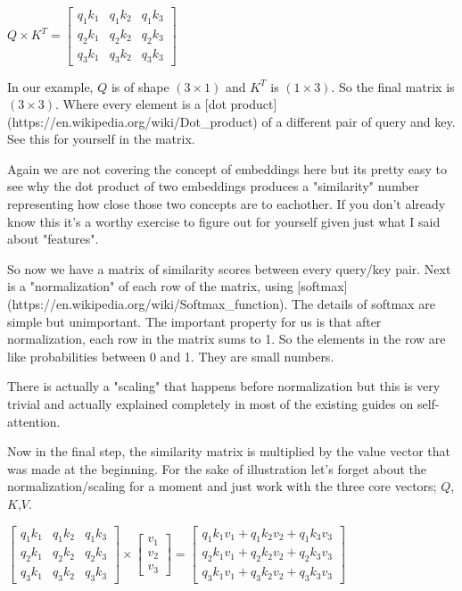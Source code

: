 $Q \times K^T = \begin{bmatrix}
    q_1 k_1 & q_1 k_2 & q_1 k_3 \\
    q_2 k_1 & q_2 k_2 & q_2 k_3 \\
    q_3 k_1 & q_3 k_2 & q_3 k_3
\end{bmatrix}
$

In our example, $Q$ is of shape $(3\times1)$ and $K^T$ is $(1\times3)$. So the final matrix is $(3\times3)$. Where every element is a [dot product](https://en.wikipedia.org/wiki/Dot_product) of a different pair of query and key. See this for yourself in the matrix.

Again we are not covering the concept of embeddings here but its pretty easy to see why the dot product of two embeddings produces a "similarity" number representing how close those two concepts are to eachother. If you don't already know this it's a worthy exercise to figure out for yourself given just what I said about "features".

So now we have a matrix of similarity scores between every query/key pair. Next is a "normalization" of each row of the matrix, using [softmax](https://en.wikipedia.org/wiki/Softmax_function). The details of softmax are simple but unimportant. The important property for us is that after normalization, each row in the matrix sums to 1. So the elements in the row are like probabilities between 0 and 1. They are small numbers.

There is actually a "scaling" that happens before normalization but this is very trivial and actually explained completely in most of the existing guides on self-attention.

Now in the final step, the similarity matrix is multiplied by the value vector that was made at the beginning. For the sake of illustration let's forget about the normalization/scaling for a moment and just work with the three core vectors; $Q$,$K$,$V$.

$
\begin{bmatrix}
    q_1 k_1 & q_1 k_2 & q_1 k_3 \\
    q_2 k_1 & q_2 k_2 & q_2 k_3 \\
    q_3 k_1 & q_3 k_2 & q_3 k_3
\end{bmatrix}
 \times
\begin{bmatrix}
    v_1 \\
    v_2 \\
    v_3 
\end{bmatrix} =
\begin{bmatrix}
    q_1k_1v_1 + q_1k_2v_2 + q_1k_3v_3 \\
    q_2k_1v_1 + q_2k_2v_2 + q_2k_3v_3 \\
    q_3k_1v_1 + q_3k_2v_2 + q_3k_3v_3
\end{bmatrix}
$

